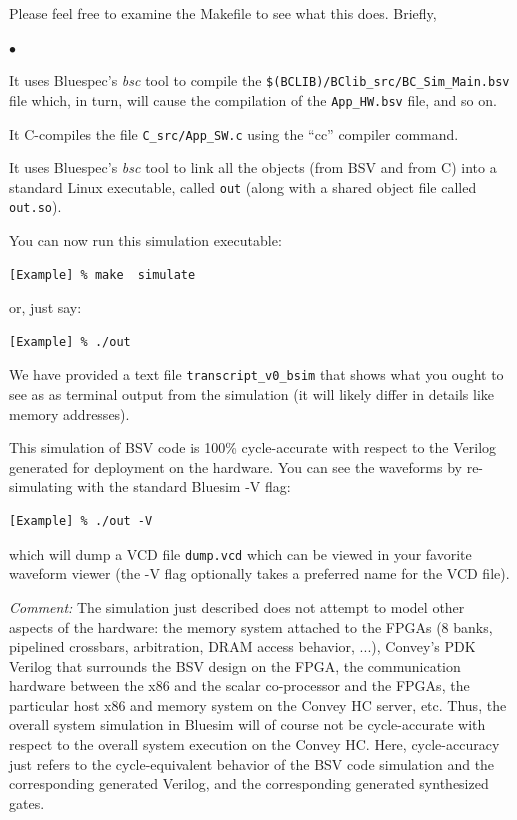 \documentclass[twoside,letterpaper,11pt]{article}
\newenvironment{tightlist}%
{\begin{list}{$\bullet$}{%
    \setlength{\topsep}{0in}
    \setlength{\partopsep}{0in}
    \setlength{\itemsep}{0in}
    \setlength{\parsep}{0in}
    \setlength{\leftmargin}{1.5em}
    \setlength{\rightmargin}{0in}
    \setlength{\itemindent}{0in}
}
}%
{\end{list}
}
\begin{document}
Please feel free to examine the Makefile to see what this does.  Briefly,

\begin{tightlist}

\item It uses Bluespec's \emph{bsc} tool to compile the
\verb|$(BCLIB)/BClib_src/BC_Sim_Main.bsv| file which, in turn, will
cause the compilation of the \verb|App_HW.bsv| file, and so on.

\item It C-compiles the file \verb|C_src/App_SW.c| using the ``cc''
compiler command.

\item It uses Bluespec's \emph{bsc} tool to link all the objects (from
BSV and from C) into a standard Linux executable, called \verb|out|
(along with a shared object file called \verb|out.so|).
\end{tightlist}

You can now run this simulation executable:
\begin{Verbatim}[frame=single, label=Run Bluesim simulation] 
[Example] % make  simulate
\end{Verbatim}
or, just say:
\begin{Verbatim}[frame=single, label=Run Bluesim simulation] 
[Example] % ./out
\end{Verbatim}
We have provided a text file \verb|transcript_v0_bsim| that shows what
you ought to see as as terminal output from the simulation (it will
likely differ in details like memory addresses).

This simulation of BSV code is 100\% cycle-accurate with respect to
the Verilog generated for deployment on the hardware.  You can see the
waveforms by re-simulating with the standard Bluesim -V flag:

\begin{Verbatim}[frame=single, label=Bluesim producing VCD waveforms]
[Example] % ./out -V
\end{Verbatim}

which will dump a VCD file \verb|dump.vcd| which can be viewed in your
favorite waveform viewer (the -V flag optionally takes a preferred
name for the VCD file).

\emph{Comment:} The simulation just described does not attempt to
model other aspects of the hardware: the memory system attached to the
FPGAs (8 banks, pipelined crossbars, arbitration, DRAM access
behavior, ...), Convey's PDK Verilog that surrounds the BSV design on
the FPGA, the communication hardware between the x86 and the scalar
co-processor and the FPGAs, the particular host x86 and memory system
on the Convey HC server, etc.  Thus, the overall system simulation in
Bluesim will of course not be cycle-accurate with respect to the
overall system execution on the Convey HC.  Here, cycle-accuracy just
refers to the cycle-equivalent behavior of the BSV code simulation and
the corresponding generated Verilog, and the corresponding generated
synthesized gates.
\end{document}
